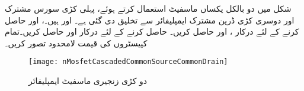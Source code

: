 شکل  میں دو بالکل یکساں ماسفیٹ استعمال کرتے ہوئے، پہلی کڑی سورس مشترک اور دوسری کڑی ڈرین مشترک ایمپلیفائر سے تخلیق دی گئی ہے۔ اور  ہیں۔،  اور  حاصل کرنے کے لئے درکار ،  اور  حاصل کریں۔ حاصل کرنے کے لئے درکار  اور  حاصل کریں۔تمام کپیسٹروں کی قیمت لامحدود تصور کریں۔

\begin{figure}
\centering
\texttt{[image: nMosfetCascadedCommonSourceCommonDrain]}
\caption{دو کڑی زنجیری ماسفیٹ ایمپلیفائر}
\label{شکل_ماسفیٹ_دو_کڑی_زنجیری_الف}
\end{figure}

